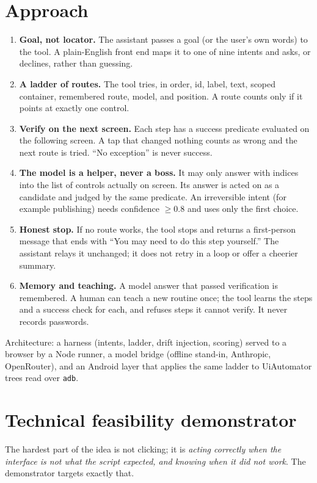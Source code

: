 \documentclass[11pt,a4paper]{article}
\begin{document}
\section{Approach}\label{sec:approach}
\begin{enumerate}
\item \textbf{Goal, not locator.} The assistant passes a goal (or the user's own words) to the tool. A plain-English front end maps it to one of nine intents and asks, or declines, rather than guessing.
\item \textbf{A ladder of routes.} The tool tries, in order, id, label, text, scoped container, remembered route, model, and position. A route counts only if it points at exactly one control.
\item \textbf{Verify on the next screen.} Each step has a success predicate evaluated on the following screen. A tap that changed nothing counts as wrong and the next route is tried. ``No exception'' is never success.
\item \textbf{The model is a helper, never a boss.} It may only answer with indices into the list of controls actually on screen. Its answer is acted on as a candidate and judged by the same predicate. An irreversible intent (for example publishing) needs confidence $\ge 0.8$ and uses only the first choice.
\item \textbf{Honest stop.} If no route works, the tool stops and returns a first-person message that ends with ``You may need to do this step yourself.'' The assistant relays it unchanged; it does not retry in a loop or offer a cheerier summary.
\item \textbf{Memory and teaching.} A model answer that passed verification is remembered. A human can teach a new routine once; the tool learns the steps and a success check for each, and refuses steps it cannot verify. It never records passwords.
\end{enumerate}
Architecture: a harness (intents, ladder, drift injection, scoring) served to a browser by a Node runner, a model bridge (offline stand-in, Anthropic, OpenRouter), and an Android layer that applies the same ladder to UiAutomator trees read over \texttt{adb}.

\section{Technical feasibility demonstrator}\label{sec:demo}
The hardest part of the idea is not clicking; it is \emph{acting correctly when the interface is not what the script expected, and knowing when it did not work}. The demonstrator targets exactly that.
\end{document}
